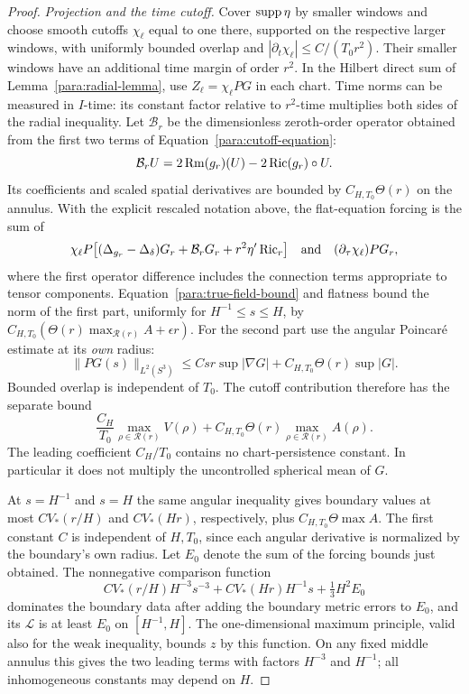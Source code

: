 \begin{proof}
\emph{Projection and the time cutoff.}
Cover $\operatorname{supp}\eta$ by smaller windows and choose smooth cutoffs
$\chi_\ell$ equal to one there, supported on the respective larger
windows, with uniformly bounded overlap and
$|\partial_t\chi_\ell|\le C/(T_0r^2)$.
Their smaller windows have an additional time margin of order $r^2$.
In the Hilbert direct sum of Lemma~\ref{para:radial-lemma}, use
$Z_\ell=\chi_\ell PG$ in each chart.  Time norms can be measured
in $I$-time: its constant factor relative to $r^2$-time multiplies
both sides of the radial inequality.
Let $\mathcal B_r$ be the dimensionless zeroth-order operator obtained
from the first two terms of Equation~\eqref{para:cutoff-equation}:
\[
 \mathcal B_rU=2\operatorname{Rm}(g_r)(U)-2\operatorname{Ric}(g_r)\circ U.
\]
Its coefficients and scaled spatial derivatives are bounded by
$C_{H,T_0}\Theta(r)$ on the annulus.  With the explicit rescaled
notation above, the flat-equation forcing is the sum of
\[
 \chi_\ell P\bigl[(\Delta_{g_r}-\Delta_\delta)G_r
       +\mathcal B_rG_r+r^2\eta'\operatorname{Ric}_r\bigr]
 \quad\hbox{and}\quad (\partial_\tau\chi_\ell)PG_r,
\]
where the first operator difference includes the connection terms
appropriate to tensor components.
Equation~\eqref{para:true-field-bound} and flatness bound the norm
of the first part, uniformly for $H^{-1}\le s\le H$, by
$C_{H,T_0}(\Theta(r)\max_{\mathcal R(r)}A+\epsilon r)$.
For the second part use the angular Poincar\'e estimate at its
\emph{own} radius:
\[
 \|PG(s)\|_{L^2(S^3)}
 \le Csr\sup|\nabla G|+C_{H,T_0}\Theta(r)\sup|G|.
\]
Bounded overlap is independent of $T_0$.  The cutoff contribution
therefore has the separate bound
\begin{equation}
 \frac{C_H}{T_0}\max_{\rho\in\mathcal R(r)}V(\rho)
   +C_{H,T_0}\Theta(r)\max_{\rho\in\mathcal R(r)}A(\rho).
 \label{para:time-cutoff-term}
\end{equation}
The leading coefficient $C_H/T_0$ contains no chart-persistence
constant.  In particular it does not multiply the uncontrolled
spherical mean of $G$.

At $s=H^{-1}$ and $s=H$ the same angular inequality gives
boundary values at most $C V_*(r/H)$ and $C V_*(Hr)$,
respectively, plus $C_{H,T_0}\Theta\max A$.
The first constant $C$ is independent of $H,T_0$, since each
angular derivative is normalized by the boundary's own radius.
Let $E_0$ denote the sum of the forcing bounds just obtained.
The nonnegative comparison function
\[
 C V_*(r/H)H^{-3}s^{-3}
  +C V_*(Hr)H^{-1}s+\tfrac13H^2E_0
\]
dominates the boundary data after adding the boundary metric errors
to $E_0$, and its $\mathcal L$ is at least $E_0$ on
$[H^{-1},H]$.  The one-dimensional maximum principle, valid also
for the weak inequality, bounds $z$ by this function.  On any fixed
middle annulus this gives the two leading terms with factors
$H^{-3}$ and $H^{-1}$; all inhomogeneous constants may depend on $H$.


\end{proof}
